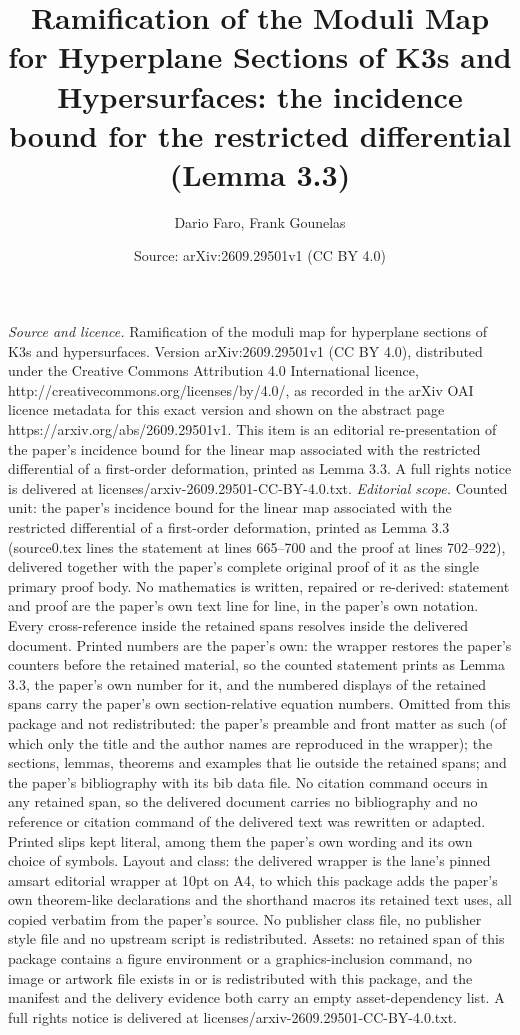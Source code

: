 \documentclass[10pt,a4paper]{amsart}
\title[Ramification of the moduli map for hyperplane sections]{Ramification of the Moduli Map for Hyperplane Sections of K3s and Hypersurfaces: the incidence bound for the restricted differential (Lemma 3.3)}
\author[D. Faro, F. Gounelas]{Dario Faro, Frank Gounelas}
\date{Source: arXiv:2609.29501v1 (CC BY 4.0)}
\numberwithin{equation}{section}
\theoremstyle{plain}
\theoremstyle{definition}
\theoremstyle{plain}
\theoremstyle{definition}
\begin{document}
\maketitle
\vspace{1em}
\noindent\textit{Source and licence.} Ramification of the moduli map for hyperplane sections of K3s and hypersurfaces. Version arXiv:2609.29501v1 (CC BY 4.0), distributed under the Creative Commons Attribution 4.0 International licence, http://creativecommons.org/licenses/by/4.0/, as recorded in the arXiv OAI licence metadata for this exact version and shown on the abstract page https://arxiv.org/abs/2609.29501v1. This item is an editorial re-presentation of the paper's incidence bound for the linear map associated with the restricted differential of a first-order deformation, printed as Lemma 3.3. A full rights notice is delivered at licenses/arxiv-2609.29501-CC-BY-4.0.txt.
\noindent\textit{Editorial scope.} Counted unit: the paper's incidence bound for the linear map associated with the restricted differential of a first-order deformation, printed as Lemma 3.3 (source0.tex lines the statement at lines 665--700 and the proof at lines 702--922), delivered together with the paper's complete original proof of it as the single primary proof body. No mathematics is written, repaired or re-derived: statement and proof are the paper's own text line for line, in the paper's own notation. Every cross-reference inside the retained spans resolves inside the delivered document. Printed numbers are the paper's own: the wrapper restores the paper's counters before the retained material, so the counted statement prints as Lemma 3.3, the paper's own number for it, and the numbered displays of the retained spans carry the paper's own section-relative equation numbers. Omitted from this package and not redistributed: the paper's preamble and front matter as such (of which only the title and the author names are reproduced in the wrapper); the sections, lemmas, theorems and examples that lie outside the retained spans; and the paper's bibliography with its bib data file. No citation command occurs in any retained span, so the delivered document carries no bibliography and no reference or citation command of the delivered text was rewritten or adapted. Printed slips kept literal, among them the paper's own wording and its own choice of symbols. Layout and class: the delivered wrapper is the lane's pinned amsart editorial wrapper at 10pt on A4, to which this package adds the paper's own theorem-like declarations and the shorthand macros its retained text uses, all copied verbatim from the paper's source. No publisher class file, no publisher style file and no upstream script is redistributed. Assets: no retained span of this package contains a figure environment or a graphics-inclusion command, no image or artwork file exists in or is redistributed with this package, and the manifest and the delivery evidence both carry an empty asset-dependency list. A full rights notice is delivered at licenses/arxiv-2609.29501-CC-BY-4.0.txt.
\end{document}

